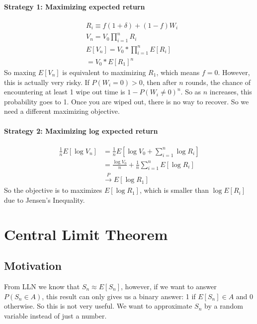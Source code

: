 \paragraph{Strategy 1: Maximizing expected return}
    \begin{align*}
        & R_i \equiv f (1 + \delta) + (1-f) W_i \\
        & V_n = V_0 \prod_{i=1}^n R_i \\
        & E[V_n] = V_0 * \prod_{i=1}^n E[R_i] \tag{Independent assumption}  \\
        & = V_0 * E[R_1]^n
    \end{align*}
So maxing $E[V_n]$ is equivalent to maximizing $R_1$, which means $f=0$. However, this is actually very risky. If $P(W_i=0) > 0$, then after $n$ rounds, the chance of encountering at least 1 wipe out time is $1 - P(W_i \neq 0)^n$. So as $n$ increases, this probability goes to 1. Once you are wiped out, there is no way to recover. So we need a different maximizing objective. 

\paragraph{Strategy 2: Maximizing log expected return} 
    \begin{align*}
        \frac{1}{n} E[\log V_n] 
        & = \frac{1}{n} E[\log V_0 + \sum_{i=1}^n \log R_i] \\
        & = \frac{\log V_0}{n} + \frac{1}{n} \sum_{i=1}^n E[\log R_i]\\
        & \overset{P}{\to} E[\log R_1]
    \end{align*}
So the objective is to maximizes $E[\log R_1]$, which is smaller than $\log E[R_i]$ due to Jensen's Inequality. 





\section{Central Limit Theorem}
\subsection{Motivation}
From LLN we know that $S_n \approx E[S_n]$, however, if we want to answer $P(S_n \in A)$, this result can only gives us a binary answer: 1 if $E[S_n]\in A$ and 0 otherwise. So this is not very useful. We want to approximate $S_n$ by a random variable instead of just a number. 

